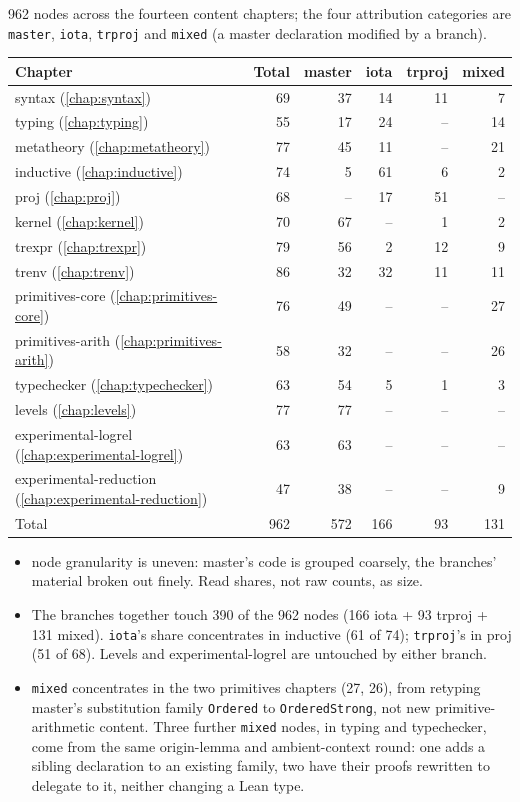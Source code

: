 962 nodes across the fourteen content chapters; the four attribution categories are
\texttt{master}, \texttt{iota}, \texttt{trproj} and \texttt{mixed} (a master declaration modified
by a branch).

\par\smallskip\noindent
\begin{tabular}{lrrrrr}
\toprule
Chapter & Total & master & iota & trproj & mixed \\
\midrule
syntax (\ref{chap:syntax}) & 69 & 37 & 14 & 11 & 7 \\
typing (\ref{chap:typing}) & 55 & 17 & 24 & -- & 14 \\
metatheory (\ref{chap:metatheory}) & 77 & 45 & 11 & -- & 21 \\
inductive (\ref{chap:inductive}) & 74 & 5 & 61 & 6 & 2 \\
proj (\ref{chap:proj}) & 68 & -- & 17 & 51 & -- \\
kernel (\ref{chap:kernel}) & 70 & 67 & -- & 1 & 2 \\
trexpr (\ref{chap:trexpr}) & 79 & 56 & 2 & 12 & 9 \\
trenv (\ref{chap:trenv}) & 86 & 32 & 32 & 11 & 11 \\
primitives-core (\ref{chap:primitives-core}) & 76 & 49 & -- & -- & 27 \\
primitives-arith (\ref{chap:primitives-arith}) & 58 & 32 & -- & -- & 26 \\
typechecker (\ref{chap:typechecker}) & 63 & 54 & 5 & 1 & 3 \\
levels (\ref{chap:levels}) & 77 & 77 & -- & -- & -- \\
experimental-logrel (\ref{chap:experimental-logrel}) & 63 & 63 & -- & -- & -- \\
experimental-reduction (\ref{chap:experimental-reduction}) & 47 & 38 & -- & -- & 9 \\
\midrule
Total & 962 & 572 & 166 & 93 & 131 \\
\bottomrule
\end{tabular}\par\smallskip

\begin{itemize}
\item {} node granularity is uneven: master's code is grouped coarsely, the branches'
material broken out finely. Read shares, not raw counts, as size.
\item The branches together touch 390 of the 962 nodes (166 iota + 93 trproj + 131 mixed).
\texttt{iota}'s share concentrates in inductive (61 of 74); \texttt{trproj}'s in proj (51 of 68).
Levels and experimental-logrel are untouched by either branch.
\item \texttt{mixed} concentrates in the two primitives chapters (27, 26), from retyping master's
substitution family \texttt{Ordered} to \texttt{OrderedStrong}, not new primitive-arithmetic
content. Three further \texttt{mixed} nodes, in typing and typechecker, come from the same
origin-lemma and ambient-context round: one adds a sibling declaration to an existing family,
two have their proofs rewritten to delegate to it, neither changing a Lean type.
\end{itemize}

